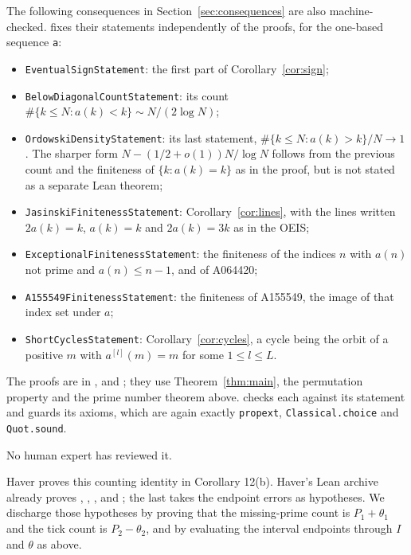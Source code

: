 The following consequences in Section~\ref{sec:consequences} are also
machine-checked.  fixes their statements
independently of the proofs, for the one-based sequence \texttt{a}:
\begin{itemize}
\item \texttt{EventualSignStatement}: the first part of
  Corollary~\ref{cor:sign};
\item \texttt{BelowDiagonalCountStatement}: its count
  $\#\{k\leq N:a(k)<k\}\sim N/(2\log N)$;
\item \texttt{OrdowskiDensityStatement}: its last statement,
  $\#\{k\leq N:a(k)>k\}/N\to1$. The sharper form
  $N-(1/2+o(1))N/\log N$ follows from the previous count and the
  finiteness of $\{k:a(k)=k\}$ as in the proof, but is not stated
  as a separate Lean theorem;
\item \texttt{JasinskiFinitenessStatement}: Corollary~\ref{cor:lines},
  with the lines written $2a(k)=k$, $a(k)=k$ and $2a(k)=3k$ as in the OEIS;
\item \texttt{ExceptionalFinitenessStatement}: the finiteness of the
  indices $n$ with $a(n)$ not prime and $a(n)\leq n-1$, and of A064420;
\item \texttt{A155549FinitenessStatement}: the finiteness of A155549,
  the image of that index set under $a$;
\item \texttt{ShortCyclesStatement}: Corollary~\ref{cor:cycles}, a cycle
  being the orbit of a positive $m$ with $a^{[l]}(m)=m$ for some
  $1\leq l\leq L$.
\end{itemize}
The proofs are in ,
 and ; they use
Theorem~\ref{thm:main}, the permutation property and the prime number
theorem above.  checks each against its statement and
guards its axioms, which are again exactly
\texttt{propext}, \texttt{Classical.choice} and \texttt{Quot.sound}.

No human expert has reviewed it.


Haver proves this counting identity in Corollary 12(b).
Haver's Lean archive already proves ,
, , and
; the last takes the
endpoint errors as hypotheses. We discharge those hypotheses by proving
that the missing-prime count is $P_1+\theta_1$ and the tick count is
$P_2-\theta_2$, and by evaluating the interval endpoints through $I$
and $\theta$ as above.

